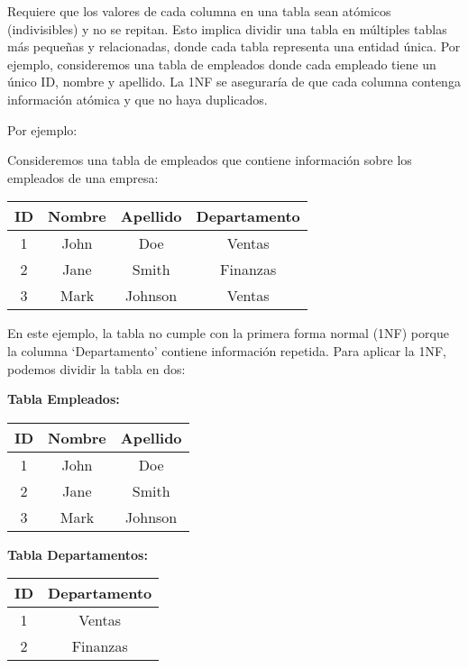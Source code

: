 \documentclass[executivepaper]{article}
\begin{document}
Requiere que los valores de cada columna en una tabla sean atómicos (indivisibles) y no se repitan. Esto implica dividir una tabla en múltiples tablas más pequeñas y relacionadas, donde cada tabla representa una entidad única. Por ejemplo, consideremos una tabla de empleados donde cada empleado tiene un único ID, nombre y apellido. La 1NF se aseguraría de que cada columna contenga información atómica y que no haya duplicados.

Por ejemplo:

Consideremos una tabla de empleados que contiene información sobre los empleados de una empresa:

\begin{center}
\begin{tabular}{|c|c|c|c|}
\hline
\textbf{ID} & \textbf{Nombre} & \textbf{Apellido} & \textbf{Departamento} \\
\hline
1 & John & Doe & Ventas \\
\hline
2 & Jane & Smith & Finanzas \\
\hline
3 & Mark & Johnson & Ventas \\
\hline
\end{tabular}
\end{center}

En este ejemplo, la tabla no cumple con la primera forma normal (1NF) porque la columna \enquote*{Departamento} contiene información repetida. Para aplicar la 1NF, podemos dividir la tabla en dos:

\textbf{Tabla Empleados:}
\begin{center}
\begin{tabular}{|c|c|c|}
\hline
\textbf{ID} & \textbf{Nombre} & \textbf{Apellido} \\
\hline
1 & John & Doe \\
\hline
2 & Jane & Smith \\
\hline
3 & Mark & Johnson \\
\hline
\end{tabular}
\end{center}

\textbf{Tabla Departamentos:}
\begin{center}
\begin{tabular}{|c|c|}
\hline
\textbf{ID} & \textbf{Departamento} \\
\hline
1 & Ventas \\
\hline
2 & Finanzas \\
\hline
\end{tabular}
\end{center}
\end{document}
